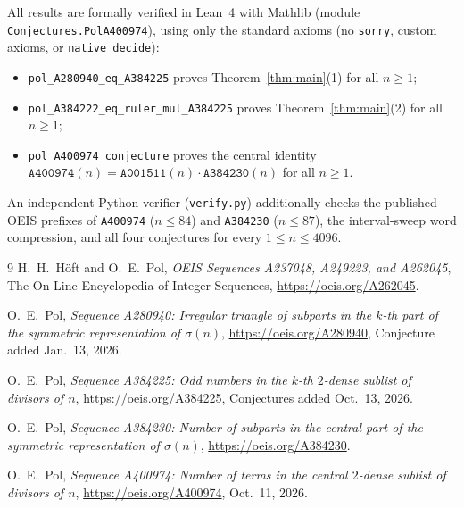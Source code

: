 \documentclass[11pt]{article}
\begin{document}
All results are formally verified in Lean~4 with Mathlib (module \texttt{Conjectures.PolA400974}), using only the standard axioms (no \texttt{sorry}, custom axioms, or \texttt{native\_decide}):
\begin{itemize}
  \item \texttt{pol\_A280940\_eq\_A384225} proves Theorem~\ref{thm:main}(1) for all $n \ge 1$;
  \item \texttt{pol\_A384222\_eq\_ruler\_mul\_A384225} proves Theorem~\ref{thm:main}(2) for all $n \ge 1$;
  \item \texttt{pol\_A400974\_conjecture} proves the central identity $\texttt{A400974}(n) = \texttt{A001511}(n)\cdot \texttt{A384230}(n)$ for all $n \ge 1$.
\end{itemize}
An independent Python verifier (\texttt{verify.py}) additionally checks the published OEIS prefixes of \texttt{A400974} ($n \le 84$) and \texttt{A384230} ($n \le 87$), the interval-sweep word compression, and all four conjectures for every $1 \le n \le 4096$.

\begin{thebibliography}{9}
H.~H.~H\"oft and O.~E.~Pol, \emph{OEIS Sequences A237048, A249223, and A262045}, The On-Line Encyclopedia of Integer Sequences, \url{https://oeis.org/A262045}.

O.~E.~Pol, \emph{Sequence A280940: Irregular triangle of subparts in the $k$-th part of the symmetric representation of $\sigma(n)$}, \url{https://oeis.org/A280940}, Conjecture added Jan.~13, 2026.

O.~E.~Pol, \emph{Sequence A384225: Odd numbers in the $k$-th $2$-dense sublist of divisors of $n$}, \url{https://oeis.org/A384225}, Conjectures added Oct.~13, 2026.

O.~E.~Pol, \emph{Sequence A384230: Number of subparts in the central part of the symmetric representation of $\sigma(n)$}, \url{https://oeis.org/A384230}.

O.~E.~Pol, \emph{Sequence A400974: Number of terms in the central $2$-dense sublist of divisors of $n$}, \url{https://oeis.org/A400974}, Oct.~11, 2026.
\end{thebibliography}
\end{document}
